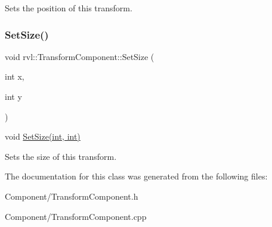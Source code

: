 Sets the position of this transform. \mbox{\label{classrvl_1_1_transform_component_a5f68c11c50a2d0b9d2121047dec90311}} 
\subsubsection{\texorpdfstring{Set\+Size()}{SetSize()}}
{\footnotesize\ttfamily void rvl\+::\+Transform\+Component\+::\+Set\+Size (\begin{DoxyParamCaption}\item[{int}]{x,  }\item[{int}]{y }\end{DoxyParamCaption})}



void \hyperlink{classrvl_1_1_transform_component_a5f68c11c50a2d0b9d2121047dec90311}{Set\+Size(int, int)} 

Sets the size of this transform. 

The documentation for this class was generated from the following files\+:\begin{DoxyCompactItemize}
\item 
Component/Transform\+Component.\+h\item 
Component/Transform\+Component.\+cpp\end{DoxyCompactItemize}
